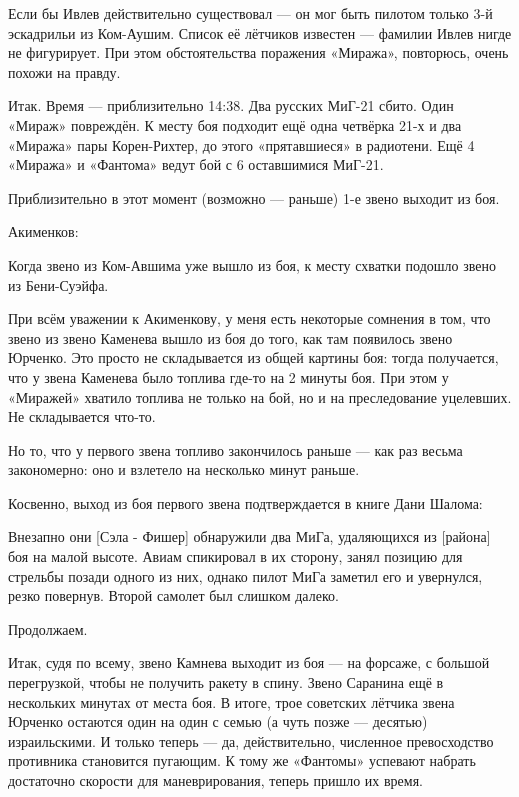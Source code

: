 Если бы Ивлев действительно существовал — он мог быть пилотом только 3-й эскадрильи из Ком-Аушим. Список её лётчиков известен — фамилии Ивлев нигде не фигурирует. При этом обстоятельства поражения «Миража», повторюсь, очень похожи на правду.

Итак. Время — приблизительно 14:38. Два русских МиГ-21 сбито. Один «Мираж» повреждён. К месту боя подходит ещё одна четвёрка 21-х и два «Миража» пары Корен-Рихтер, до этого «прятавшиеся» в радиотени. Ещё 4 «Миража» и «Фантома» ведут бой с 6 оставшимися МиГ-21.

Приблизительно в этот момент (возможно — раньше) 1-е звено выходит из боя.

Акименков:

\begin{textcitation}
	Когда звено из Ком-Авшима уже вышло из боя, к месту схватки подошло звено из Бени-Суэйфа.
\end{textcitation}

При всём уважении к Акименкову, у меня есть некоторые сомнения в том, что звено из звено Каменева вышло из боя до того, как там появилось звено Юрченко. Это просто не складывается из общей картины боя: тогда получается, что у звена Каменева было топлива где-то на 2 минуты боя. При этом у «Миражей» хватило топлива не только на бой, но и на преследование уцелевших. Не складывается что-то.

Но то, что у первого звена топливо закончилось раньше — как раз весьма закономерно: оно и взлетело на несколько минут раньше.

Косвенно, выход из боя первого звена подтверждается в книге Дани Шалома:

\begin{textcitation}
	Внезапно они [Сэла - Фишер] обнаружили два МиГа, удаляющихся из [района] боя на малой высоте. Авиам спикировал в их сторону, занял позицию для стрельбы позади одного из них, однако пилот МиГа заметил его и увернулся, резко повернув. Второй самолет был слишком далеко.
\end{textcitation}

Продолжаем.

Итак, судя по всему, звено Камнева выходит из боя — на форсаже, с большой перегрузкой, чтобы не получить ракету в спину. Звено Саранина ещё в нескольких минутах от места боя. В итоге, трое советских лётчика звена Юрченко остаются один на один с семью (а чуть позже — десятью) израильскими. И только теперь — да, действительно, численное превосходство противника становится пугающим. К тому же «Фантомы» успевают набрать достаточно скорости для маневрирования, теперь пришло их время.


